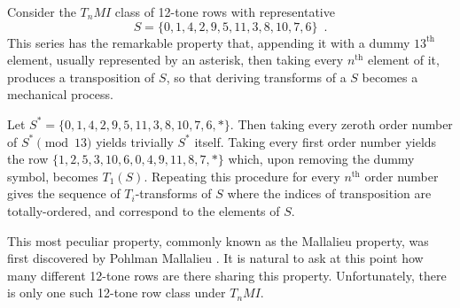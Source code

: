 Consider the $T_nMI$ class of 12-tone rows with representative
\begin{equation}
	S = \{ 0, 1, 4, 2, 9, 5, 11, 3, 8, 10, 7, 6 \} \enspace.
\end{equation}
This series has the remarkable property that, appending it with a dummy $13^\text{th}$ element, usually represented by an asterisk, then taking every $n^\text{th}$ element of it, produces a transposition of $S$, so that deriving transforms of a $S$ becomes a mechanical process.

\begin{example}
	Let $S^* = \{ 0, 1, 4, 2, 9, 5, 11, 3, 8, 10, 7, 6, * \}$. Then taking every zeroth order number of $S^* \pmod{13}$ yields trivially $S^*$ itself. Taking every first order number yields the row $\{ 1, 2, 5, 3, 10, 6, 0, 4, 9, 11, 8, 7, * \}$ which, upon removing the dummy symbol, becomes $T_1(S)$. Repeating this procedure for every $n^\text{th}$ order number gives the sequence of $T_i$-transforms of $S$ where the indices of transposition are totally-ordered, and correspond to the elements of $S$.
\end{example}

This most peculiar property, commonly known as the Mallalieu property, was first discovered by Pohlman Mallalieu \cite[285]{Lewin1966}. It is natural to ask at this point how many different 12-tone rows are there sharing this property. Unfortunately, there is only one such 12-tone row class under $T_nMI$.

